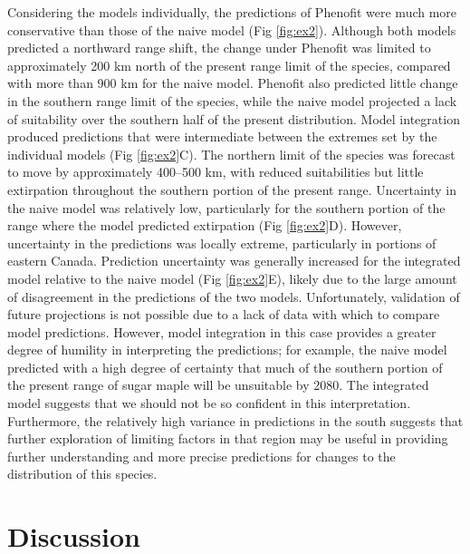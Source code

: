 \documentclass[11pt]{article}
\begin{document}
Considering the models individually, the predictions of Phenofit were much more conservative than those of the naive model (Fig \ref{fig:ex2}).
Although both models predicted a northward range shift, the change under Phenofit was limited to approximately 200 km north of the present range limit of the species, compared with more than 900 km for the naive model.
Phenofit also predicted little change in the southern range limit of the species, while the naive model projected a lack of suitability over the southern half of the present distribution.
Model integration produced predictions that were intermediate between the extremes set by the individual models (Fig \ref{fig:ex2}C).
The northern limit of the species was forecast to move by approximately 400--500 km, with reduced suitabilities but little extirpation throughout the southern portion of the present range.
Uncertainty in the naive model was relatively low, particularly for the southern portion of the range where the model predicted extirpation (Fig \ref{fig:ex2}D).
However, uncertainty in the predictions was locally extreme, particularly in portions of eastern Canada.
Prediction uncertainty was generally increased for the integrated model relative to the naive model (Fig \ref{fig:ex2}E), likely due to the large amount of disagreement in the predictions of the two models.
Unfortunately, validation of future projections is not possible due to a lack of data with which to compare model predictions.
However, model integration in this case provides a greater degree of humility in interpreting the predictions; for example, the naive model predicted with a high degree of certainty that much of the southern portion of the present range of sugar maple will be unsuitable by 2080.
The integrated model suggests that we should not be so confident in this interpretation.
Furthermore, the relatively high variance in predictions in the south suggests that further exploration of limiting factors in that region may be useful in providing further understanding and more precise predictions for changes to the distribution of this species.


%
%



\section*{Discussion}
\end{document}
